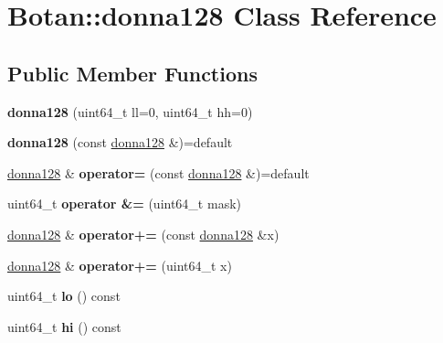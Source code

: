 \hypertarget{class_botan_1_1donna128}{}\section{Botan\+:\+:donna128 Class Reference}
\label{class_botan_1_1donna128}
\subsection*{Public Member Functions}
\begin{DoxyCompactItemize}
\item 
\mbox{\label{class_botan_1_1donna128_a792bbd130893fa2bfb019a69a429668a}} 
{\bfseries donna128} (uint64\+\_\+t ll=0, uint64\+\_\+t hh=0)
\item 
\mbox{\label{class_botan_1_1donna128_aede34e2f649988b9ff0845b70eb6c928}} 
{\bfseries donna128} (const \mbox{\hyperlink{class_botan_1_1donna128}{donna128}} \&)=default
\item 
\mbox{\label{class_botan_1_1donna128_a98906c767fa61c55ba41bcf205fbbcc0}} 
\mbox{\hyperlink{class_botan_1_1donna128}{donna128}} \& {\bfseries operator=} (const \mbox{\hyperlink{class_botan_1_1donna128}{donna128}} \&)=default
\item 
\mbox{\label{class_botan_1_1donna128_af8c1a8c9448fd5b3ffb6fbcb98c3796f}} 
uint64\+\_\+t {\bfseries operator \&=} (uint64\+\_\+t mask)
\item 
\mbox{\label{class_botan_1_1donna128_a4d87347090642779e6a1daba366a3655}} 
\mbox{\hyperlink{class_botan_1_1donna128}{donna128}} \& {\bfseries operator+=} (const \mbox{\hyperlink{class_botan_1_1donna128}{donna128}} \&x)
\item 
\mbox{\label{class_botan_1_1donna128_ad1029db11eb7ed9bb52f943b489cfe90}} 
\mbox{\hyperlink{class_botan_1_1donna128}{donna128}} \& {\bfseries operator+=} (uint64\+\_\+t x)
\item 
\mbox{\label{class_botan_1_1donna128_a4872394fef1ee219b756732c9b41a675}} 
uint64\+\_\+t {\bfseries lo} () const
\item 
\mbox{\label{class_botan_1_1donna128_aa7bef46a2784f1953995169a54459126}} 
uint64\+\_\+t {\bfseries hi} () const
\end{DoxyCompactItemize}
